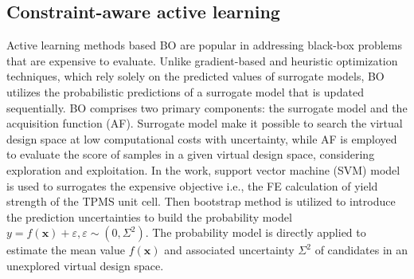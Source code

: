 \documentclass[preprint,review,12pt,authoryear]{elsarticle}
\begin{document}
\subsection{Constraint-aware active learning}
\label{sec:2-4}
Active learning methods based BO are popular in addressing black-box problems that are expensive to evaluate. Unlike gradient-based and heuristic optimization techniques, which rely solely on the predicted values of surrogate models, BO utilizes the probabilistic predictions of a surrogate model that is updated sequentially. BO comprises two primary components: the surrogate model and the acquisition function (AF). Surrogate model make it possible to search the virtual design space at low computational costs with uncertainty, while AF is employed to evaluate the score of samples in a given virtual design space, considering exploration and exploitation. In the work, support vector machine (SVM) model is used to surrogates the expensive objective i.e., the FE calculation of yield strength of the TPMS unit cell. Then bootstrap method is utilized to introduce the prediction uncertainties to build the probability model $y=f(\boldsymbol{x})+\varepsilon,\varepsilon\sim(0, \Sigma^2)$. The probability model is directly applied to estimate the mean value $f(\boldsymbol{x})$ and associated uncertainty $\Sigma^2$ of candidates in an unexplored virtual design space.
\end{document}
